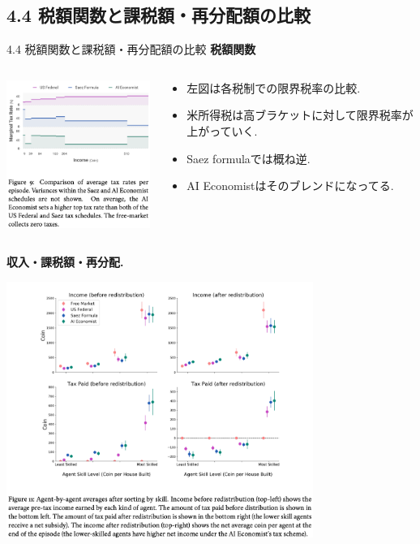 \documentclass[unicode,aspectratio=169,11pt]{beamer}
\begin{document}
\subsection{4.4 税額関数と課税額・再分配額の比較}
\begin{frame}{4.4 税額関数と課税額・再分配額の比較}{}
    {\bf 税額関数}
    \begin{columns}
        \begin{column}{0.5\textwidth}
            \begin{center}
                \includegraphics[width=6cm]{figure9.png}
            \end{center}
        \end{column}
        \begin{column}{0.5\textwidth}
            \begin{itemize}
                \item 左図は各税制での限界税率の比較.
                \item 米所得税は高ブラケットに対して限界税率が上がっていく.
                \item Saez formulaでは概ね逆.
                \item AI Economistはそのブレンドになってる.
            \end{itemize}
        \end{column}
    \end{columns}
\end{frame}

\begin{frame}{}{}
    {\bf 収入・課税額・再分配.}
    \begin{center}
        \includegraphics[width=10cm]{figure11.png}
    \end{center}
\end{frame}
\end{document}
